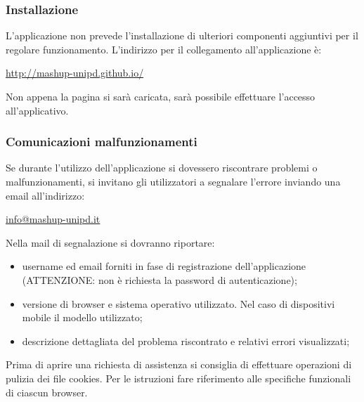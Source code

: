 		\subsubsection{Installazione} %
		\label{sec:installazione}
			L'applicazione non prevede l'installazione di ulteriori componenti aggiuntivi per il regolare funzionamento.
			L'indirizzo per il collegamento all'applicazione è:\newline
			\begin{center}
				\url{http://mashup-unipd.github.io/}
			\end{center}
			Non appena la pagina si sarà caricata, sarà possibile effettuare l'accesso all'applicativo.

		\subsubsection{Comunicazioni malfunzionamenti} %
		\label{sec:installazione}
			Se durante l'utilizzo dell'applicazione \projectName{} si dovessero riscontrare problemi o malfunzionamenti, si invitano gli utilizzatori a segnalare l'errore inviando una email all'indirizzo:
			\begin{center}
				\url{info@mashup-unipd.it}
			\end{center}
			Nella mail di segnalazione si dovranno riportare:
			\begin{itemize}
				\item username ed email forniti in fase di registrazione dell'applicazione (ATTENZIONE: non è richiesta la password di autenticazione\gloss{});
				\item versione di browser\gloss{} e sistema operativo\gloss{} utilizzato. Nel caso di dispositivi mobile il modello utilizzato;
				\item descrizione dettagliata del problema riscontrato e relativi errori visualizzati;
			\end{itemize}
			Prima di aprire una richiesta di assistenza si consiglia di effettuare operazioni di pulizia dei file cookies\gloss{}. Per le istruzioni fare riferimento alle specifiche funzionali di ciascun browser\gloss{}.


